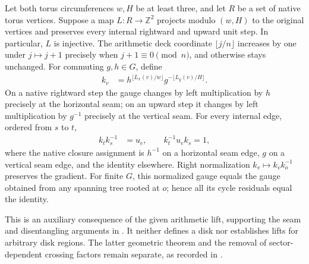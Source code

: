 \begin{lemma}%
    \label{thm:peps_torus_region_integer_lift_gauge}
    \leanok
    Let both torus circumferences $w,H$ be at least three, and let
    $R$ be a set of native torus vertices. Suppose a map
    $L:R\to\mathbb Z^2$ projects modulo $(w,H)$ to the original
    vertices and preserves every internal rightward and upward unit
    step. In particular, $L$ is injective. The arithmetic deck coordinate
    $\lfloor j/n\rfloor$ increases by one under $j\mapsto j+1$ precisely
    when $j+1\equiv0\pmod n$, and otherwise stays unchanged. For commuting $g,h\in G$,
    define
    \begin{align}
        k_v & =h^{\lfloor L_x(v)/w\rfloor}
        g^{-\lfloor L_y(v)/H\rfloor}.
    \end{align}
    On a native rightward step the gauge changes by left multiplication
    by $h$ precisely at the horizontal seam; on an upward step it
    changes by left multiplication by $g^{-1}$ precisely at the vertical
    seam. For every internal edge, ordered from $s$ to $t$,
    \begin{align}
        k_tk_s^{-1} & =u_e,\qquad k_t^{-1}u_ek_s=1,
    \end{align}
    where the native closure assignment is $h^{-1}$ on a horizontal
    seam edge, $g$ on a vertical seam edge, and the identity elsewhere.
    Right normalization $k_v\mapsto k_vk_o^{-1}$ preserves the gradient.
    For finite $G$, this normalized gauge equals the gauge obtained from
    any spanning tree rooted at $o$; hence all its cycle residuals equal
    the identity.

    This is an auxiliary consequence of the given arithmetic lift,
    supporting the seam and disentangling arguments in
    \cite[\S5.3 and Theorem~6.9]{Schuch2010PEPS}. It neither defines a
    disk nor establishes lifts for arbitrary disk regions. The latter
    geometric theorem and the removal of sector-dependent crossing
    factors remain separate, as recorded in
    \cite{gap:rmp_peps_quantum_double_g_isometry}.
\end{lemma}
